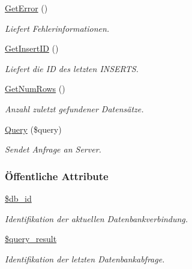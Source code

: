 \begin{CompactItemize}
\hyperlink{classSQLDB_efc9afe11649d6cdae21575717ec3436}{Get\-Error} ()
\begin{CompactList}\small\item\em Liefert Fehlerinformationen. \item\end{CompactList}\item 
\hyperlink{classSQLDB_094a5b811d412900f2435cabb2194fb8}{Get\-Insert\-ID} ()
\begin{CompactList}\small\item\em Liefert die ID des letzten INSERTS. \item\end{CompactList}\item 
\hyperlink{classSQLDB_15b181251b309ab55331be29fa33ac9f}{Get\-Num\-Rows} ()
\begin{CompactList}\small\item\em Anzahl zuletzt gefundener Datensätze. \item\end{CompactList}\item 
\hyperlink{classSQLDB_fc6ffa8df50f68f07d9f5e3385b96d7a}{Query} (\$query)
\begin{CompactList}\small\item\em Sendet Anfrage an Server. \item\end{CompactList}\end{CompactItemize}
\subsubsection*{\"{O}ffentliche Attribute}
\begin{CompactItemize}
\item 
\hyperlink{classSQLDB_2c62843044a6ec53ad3384fb36aa811b}{\$db\_\-id}
\begin{CompactList}\small\item\em Identifikation der aktuellen Datenbankverbindung. \item\end{CompactList}\item 
\hyperlink{classSQLDB_879fa41a3df6664f4ce83960808326ab}{\$query\_\-result}
\begin{CompactList}\small\item\em Identifikation der letzten Datenbankabfrage. \item\end{CompactList}\end{CompactItemize}



